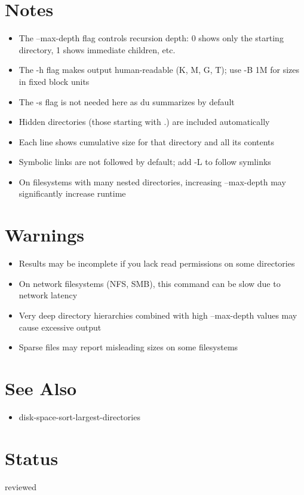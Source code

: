 \documentclass[openany]{book}
\begin{document}
\section*{Notes}
\begin{itemize}
  \item The --max-depth flag controls recursion depth: 0 shows only the starting directory, 1 shows immediate children, etc.
  \item The -h flag makes output human-readable (K, M, G, T); use -B 1M for sizes in fixed block units
  \item The -s flag is not needed here as du summarizes by default
  \item Hidden directories (those starting with .) are included automatically
  \item Each line shows cumulative size for that directory and all its contents
  \item Symbolic links are not followed by default; add -L to follow symlinks
  \item On filesystems with many nested directories, increasing --max-depth may significantly increase runtime
\end{itemize}

\section*{Warnings}
\begin{itemize}
  \item Results may be incomplete if you lack read permissions on some directories
  \item On network filesystems (NFS, SMB), this command can be slow due to network latency
  \item Very deep directory hierarchies combined with high --max-depth values may cause excessive output
  \item Sparse files may report misleading sizes on some filesystems
\end{itemize}

\section*{See Also}
\begin{itemize}
  \item disk-space-sort-largest-directories
\end{itemize}

\section*{Status}
reviewed
\end{document}
